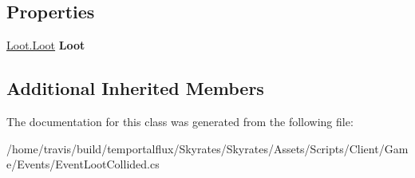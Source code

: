 \subsection*{Properties}
\begin{DoxyCompactItemize}
\item 
\hypertarget{class_skyrates_1_1_client_1_1_game_1_1_event_1_1_event_loot_collided_abdc1910bc5fdaf8424449091fe082b9c}{\hyperlink{class_skyrates_1_1_client_1_1_loot_1_1_loot}{Loot.\-Loot} {\bfseries Loot}}\label{class_skyrates_1_1_client_1_1_game_1_1_event_1_1_event_loot_collided_abdc1910bc5fdaf8424449091fe082b9c}

\end{DoxyCompactItemize}
\subsection*{Additional Inherited Members}


The documentation for this class was generated from the following file\-:\begin{DoxyCompactItemize}
\item 
/home/travis/build/temportalflux/\-Skyrates/\-Skyrates/\-Assets/\-Scripts/\-Client/\-Game/\-Events/Event\-Loot\-Collided.\-cs\end{DoxyCompactItemize}
